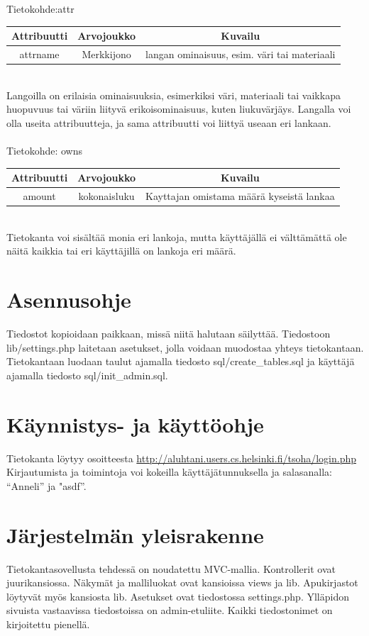 \documentclass[12pt]{article}
\begin{document}
\ \\ \ \\
Tietokohde:attr\\
\begin{tabular}{|c|c|c|}
\hline
Attribuutti & Arvojoukko & Kuvailu \\
\hline
attrname & Merkkijono & langan ominaisuus, esim. väri tai materiaali\\
\hline   
\end{tabular}
\\
Langoilla on erilaisia ominaisuuksia, esimerkiksi väri, materiaali tai vaikkapa huopuvuus tai väriin liityvä erikoisominaisuus, kuten liukuvärjäys. Langalla voi olla useita attribuutteja, ja sama attribuutti voi liittyä useaan eri lankaan. 
\ \\ \ \\
Tietokohde: owns\\
\begin{tabular}{|c|c|c|}
\hline
Attribuutti & Arvojoukko & Kuvailu \\
\hline
amount & kokonaisluku & Kayttajan omistama määrä kyseistä lankaa\\
\hline  
\end{tabular}
\\
Tietokanta voi sisältää monia eri lankoja, mutta käyttäjällä ei välttämättä ole näitä kaikkia tai eri käyttäjillä on lankoja eri määrä. 
\section{Asennusohje}
Tiedostot kopioidaan paikkaan, missä niitä halutaan säilyttää. Tiedostoon lib/settings.php laitetaan asetukset, jolla voidaan muodostaa yhteys tietokantaan. Tietokantaan luodaan taulut ajamalla tiedosto sql/create_tables.sql ja käyttäjä ajamalla tiedosto sql/init_admin.sql. 
\section{Käynnistys- ja käyttöohje}
Tietokanta löytyy osoitteesta \href{http://aluhtani.users.cs.helsinki.fi/tsoha/login.php}{http://aluhtani.users.cs.helsinki.fi/tsoha/login.php}
\\
Kirjautumista ja toimintoja voi kokeilla käyttäjätunnuksella ja salasanalla: ``Anneli'' ja "asdf''.
\section{Järjestelmän yleisrakenne}
Tietokantasovellusta tehdessä on noudatettu MVC-mallia. Kontrollerit ovat juurikansiossa. Näkymät ja malliluokat ovat kansioissa views ja lib. Apukirjastot löytyvät myös kansiosta lib. Asetukset ovat tiedostossa settings.php. Ylläpidon sivuista vastaavissa tiedostoissa on admin-etuliite. Kaikki tiedostonimet on kirjoitettu pienellä. 
\end{document}
